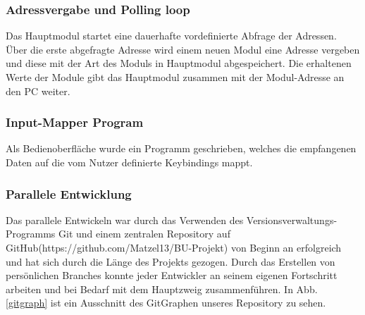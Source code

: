 \subsubsection{Adressvergabe und Polling loop}
Das Hauptmodul startet eine dauerhafte vordefinierte Abfrage der Adressen. Über die erste abgefragte Adresse wird einem neuen Modul eine Adresse vergeben und diese mit der Art des Moduls in Hauptmodul abgespeichert. Die erhaltenen Werte der Module gibt das Hauptmodul zusammen mit der Modul-Adresse an den PC weiter.

\subsubsection{Input-Mapper Program}
Als Bedienoberfläche wurde ein Programm geschrieben, welches die empfangenen Daten auf die vom Nutzer definierte Keybindings mappt.

\subsubsection{Parallele Entwicklung}
Das parallele Entwickeln war durch das Verwenden des Versionsverwaltungs-Programms \glqq Git\grqq{} und einem zentralen Repository auf \glqq GitHub\grqq{}(https://github.com/Matzel13/BU-Projekt) von Beginn an erfolgreich und hat sich durch die Länge des Projekts gezogen. Durch das Erstellen von persönlichen \glqq Branches\grqq{} konnte jeder Entwickler an seinem eigenen Fortschritt arbeiten und bei Bedarf mit dem Hauptzweig zusammenführen. In Abb. \ref{gitgraph} ist ein Ausschnitt des GitGraphen unseres Repository zu sehen.

